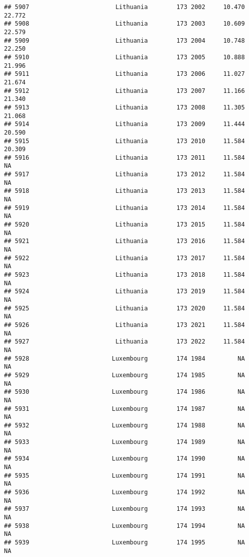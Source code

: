 \documentclass[
]{article}
\begin{document}
\begin{verbatim}
## 5907                        Lithuania        173 2002     10.470     22.772
## 5908                        Lithuania        173 2003     10.609     22.579
## 5909                        Lithuania        173 2004     10.748     22.250
## 5910                        Lithuania        173 2005     10.888     21.996
## 5911                        Lithuania        173 2006     11.027     21.674
## 5912                        Lithuania        173 2007     11.166     21.340
## 5913                        Lithuania        173 2008     11.305     21.068
## 5914                        Lithuania        173 2009     11.444     20.590
## 5915                        Lithuania        173 2010     11.584     20.309
## 5916                        Lithuania        173 2011     11.584         NA
## 5917                        Lithuania        173 2012     11.584         NA
## 5918                        Lithuania        173 2013     11.584         NA
## 5919                        Lithuania        173 2014     11.584         NA
## 5920                        Lithuania        173 2015     11.584         NA
## 5921                        Lithuania        173 2016     11.584         NA
## 5922                        Lithuania        173 2017     11.584         NA
## 5923                        Lithuania        173 2018     11.584         NA
## 5924                        Lithuania        173 2019     11.584         NA
## 5925                        Lithuania        173 2020     11.584         NA
## 5926                        Lithuania        173 2021     11.584         NA
## 5927                        Lithuania        173 2022     11.584         NA
## 5928                       Luxembourg        174 1984         NA         NA
## 5929                       Luxembourg        174 1985         NA         NA
## 5930                       Luxembourg        174 1986         NA         NA
## 5931                       Luxembourg        174 1987         NA         NA
## 5932                       Luxembourg        174 1988         NA         NA
## 5933                       Luxembourg        174 1989         NA         NA
## 5934                       Luxembourg        174 1990         NA         NA
## 5935                       Luxembourg        174 1991         NA         NA
## 5936                       Luxembourg        174 1992         NA         NA
## 5937                       Luxembourg        174 1993         NA         NA
## 5938                       Luxembourg        174 1994         NA         NA
## 5939                       Luxembourg        174 1995         NA         NA

\end{verbatim}
\end{document}
